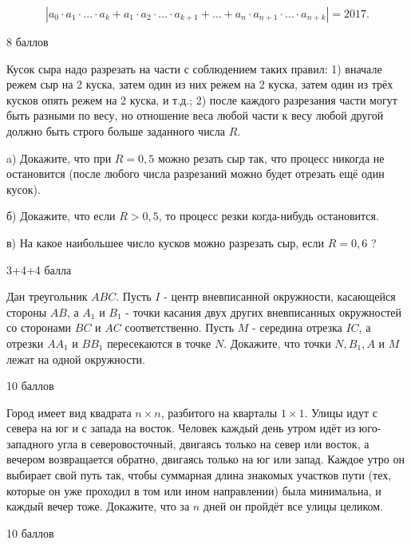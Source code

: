 $$
\left|a_0 \cdot a_1 \cdot \ldots \cdot a_k+a_1 \cdot a_2 \cdot \ldots \cdot a_{k+1}+\ldots+a_n \cdot a_{n+1} \cdot \ldots \cdot a_{n+k}\right|=2017 .
$$

\begin{flushright}
        \scriptsize{8 баллов}
\end{flushright}

\newpage

\hspace{3mm}

Кусок сыра надо разрезать на части с соблюдением таких правил: 1) вначале режем сыр на 2 куска, затем один из них режем на 2 куска, затем один из трёх кусков опять режем на 2 куска, и т.д.; 2) после каждого разрезания части могут быть разными по весу, но отношение веса любой части к весу любой другой должно быть строго больше заданного числа $R$.

a) Докажите, что при $R=0,5$ можно резать сыр так, что процесс никогда не остановится (после любого числа разрезаний можно будет отрезать ещё один кусок).

б) Докажите, что если $R>0,5$, то процесс резки когда-нибудь остановится.

в) На какое наибольшее число кусков можно разрезать сыр, если $R=0,6$ ?

\begin{flushright}
        \scriptsize{3+4+4 балла}
\end{flushright}

Дан треугольник $A B C$. Пусть $I$ - центр вневписанной окружности, касающейся стороны $A B$, а $A_1$ и $B_1$ - точки касания двух других вневписанных окружностей со сторонами $B C$ и $A C$ соответственно. Пусть $M$ - середина отрезка $I C$, а отрезки $A A_1$ и $B B_1$ пересекаются в точке $N$. Докажите, что точки $N, B_1, A$ и $M$ лежат на одной окружности.

\begin{flushright}
        \scriptsize{10 баллов}
\end{flushright}

Город имеет вид квадрата $n \times n$, разбитого на кварталы $1 \times 1$. Улицы идут с севера на юг и с запада на восток. Человек каждый день утром идёт из юго-западного угла в северовосточный, двигаясь только на север или восток, а вечером возвращается обратно, двигаясь только на юг или запад. Каждое утро он выбирает свой путь так, чтобы суммарная длина знакомых участков пути (тех, которые он уже проходил в том или ином направлении) была минимальна, и каждый вечер тоже. Докажите, что за $n$ дней он пройдёт все улицы целиком.

\begin{flushright}
        \scriptsize{10 баллов}
\end{flushright}